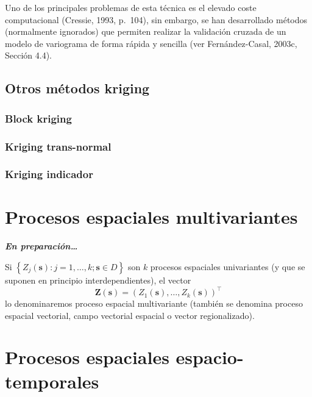 \documentclass[
  spanish,
]{book}
\theoremstyle{break}
\theoremstyle{definition}
\theoremstyle{definition}
\theoremstyle{definition}
\theoremstyle{definition}
\theoremstyle{remark}
\begin{document}
Uno de los principales problemas de esta técnica es el elevado coste
computacional (Cressie, 1993, p.~104), sin embargo, se han desarrollado métodos
(normalmente ignorados) que permiten realizar la validación cruzada de un modelo
de variograma de forma rápida y sencilla (ver Fernández-Casal, 2003c, Sección 4.4).

\hypertarget{otros-muxe9todos-kriging}{%
\section{Otros métodos kriging}\label{otros-muxe9todos-kriging}}

\hypertarget{block-kriging}{%
\subsection{Block kriging}\label{block-kriging}}

\hypertarget{kriging-trans-normal}{%
\subsection{Kriging trans-normal}\label{kriging-trans-normal}}

\hypertarget{kriging-indicador}{%
\subsection{Kriging indicador}\label{kriging-indicador}}

\hypertarget{multivar}{%
\chapter{Procesos espaciales multivariantes}\label{multivar}}

\textbf{\emph{En preparación\ldots{}}}

Si \(\left\{ Z_{j}(\mathbf{s}):j=1, \ldots, k;\mathbf{s}\in D\right\}\)
son \(k\) procesos espaciales univariantes (y que se suponen en principio interdependientes), el vector
\[\mathbf{Z}(\mathbf{s})=(Z_{1}(\mathbf{s}), \ldots, Z_{k}(\mathbf{s}))^\top\]
lo denominaremos proceso espacial multivariante (también se denomina proceso espacial vectorial, campo vectorial espacial o vector regionalizado).

\hypertarget{esp-temp}{%
\chapter{Procesos espaciales espacio-temporales}\label{esp-temp}}
\end{document}
